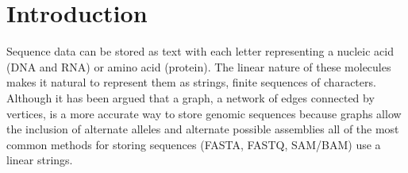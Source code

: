 \documentclass{bmcart}
\begin{document}



\section{Introduction}

Sequence data can be stored as text with each letter representing a nucleic acid (DNA and RNA) or amino acid (protein). The linear nature of these molecules makes it natural to represent them as strings, finite sequences of characters. Although it has been argued that a graph, a network of edges connected by vertices, is a more accurate way to store genomic sequences because graphs allow the inclusion of alternate alleles and alternate possible assemblies \cite{jaffe2012fastg} all of the most common methods for storing sequences (FASTA, FASTQ, SAM/BAM) use a linear strings.
\end{document}
